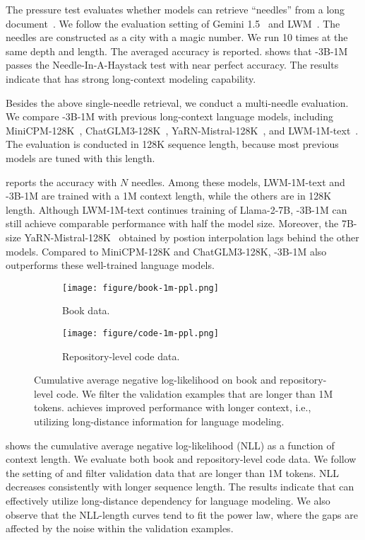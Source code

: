 The pressure test evaluates whether models can retrieve ``needles'' from a long document~\cite{needle}.
We follow the evaluation setting of Gemini 1.5~\cite{gemini1.5} and LWM~\cite{lwm}.
The needles are constructed as a city with a magic number.
We run 10 times at the same depth and length. The averaged accuracy is reported.
 shows that \our{}-3B-1M passes the Needle-In-A-Haystack test with near perfect accuracy.
The results indicate that \our{} has strong long-context modeling capability.

Besides the above single-needle retrieval, we conduct a multi-needle evaluation.
We compare \our{}-3B-1M with previous long-context language models, including MiniCPM-128K~\cite{minicpm}, ChatGLM3-128K~\cite{glm}, YaRN-Mistral-128K~\cite{yarn}, and LWM-1M-text~\cite{lwm}.
The evaluation is conducted in 128K sequence length, because most previous models are tuned with this length.

 reports the accuracy with $N$ needles.
Among these models, LWM-1M-text and \our{}-3B-1M are trained with a 1M context length, while the others are in 128K length.
Although LWM-1M-text continues training of Llama-2-7B, \our{}-3B-1M can still achieve comparable performance with half the model size.
Moreover, the 7B-size YaRN-Mistral-128K~\cite{yarn} obtained by postion interpolation lags behind the other models.
Compared to MiniCPM-128K and ChatGLM3-128K, \our{}-3B-1M also outperforms these well-trained language models.

\begin{figure*}[t]
\centering
\begin{subfigure}[b]{0.495\textwidth}
\centering
\texttt{[image: figure/book-1m-ppl.png]}
\caption{Book data.}
\end{subfigure}
\hfill
\begin{subfigure}[b]{0.495\textwidth}
\centering
\texttt{[image: figure/code-1m-ppl.png]}
\caption{Repository-level code data.}
\end{subfigure}
\caption{Cumulative average negative log-likelihood on book and repository-level code. We filter the validation examples that are longer than 1M tokens. \our{} achieves improved performance with longer context, i.e., utilizing long-distance information for language modeling.}
\label{fig:longppl}
\end{figure*}

 shows the cumulative average negative log-likelihood (NLL) as a function of context length.
We evaluate both book and repository-level code data.
We follow the setting of \cite{gemini1.5} and filter validation data that are longer than 1M tokens.
NLL decreases consistently with longer sequence length.
The results indicate that \our{} can effectively utilize long-distance dependency for language modeling.
We also observe that the NLL-length curves tend to fit the power law, where the gaps are affected by the noise within the validation examples.

